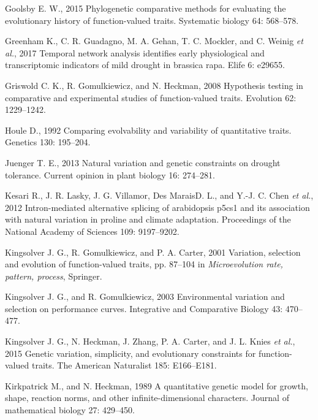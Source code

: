 \documentclass[jou,floatsintext]{apa6}
\begin{document}
\leavevmode\hypertarget{ref-goolsby2015phylogenetic}{}%
Goolsby E. W., 2015 Phylogenetic comparative methods for evaluating the evolutionary history of function-valued traits. Systematic biology 64: 568--578.

\leavevmode\hypertarget{ref-greenham2017temporal}{}%
Greenham K., C. R. Guadagno, M. A. Gehan, T. C. Mockler, and C. Weinig \emph{et al.}, 2017 Temporal network analysis identifies early physiological and transcriptomic indicators of mild drought in brassica rapa. Elife 6: e29655.

\leavevmode\hypertarget{ref-griswold2008hypothesis}{}%
Griswold C. K., R. Gomulkiewicz, and N. Heckman, 2008 Hypothesis testing in comparative and experimental studies of function-valued traits. Evolution 62: 1229--1242.

\leavevmode\hypertarget{ref-houle1992comparing}{}%
Houle D., 1992 Comparing evolvability and variability of quantitative traits. Genetics 130: 195--204.

\leavevmode\hypertarget{ref-juenger2013natural}{}%
Juenger T. E., 2013 Natural variation and genetic constraints on drought tolerance. Current opinion in plant biology 16: 274--281.

\leavevmode\hypertarget{ref-kesari2012intron}{}%
Kesari R., J. R. Lasky, J. G. Villamor, Des MaraisD. L., and Y.-J. C. Chen \emph{et al.}, 2012 Intron-mediated alternative splicing of arabidopsis p5cs1 and its association with natural variation in proline and climate adaptation. Proceedings of the National Academy of Sciences 109: 9197--9202.

\leavevmode\hypertarget{ref-kingsolver2001variation}{}%
Kingsolver J. G., R. Gomulkiewicz, and P. A. Carter, 2001 Variation, selection and evolution of function-valued traits, pp. 87--104 in \emph{Microevolution rate, pattern, process}, Springer.

\leavevmode\hypertarget{ref-kingsolver2003environmental}{}%
Kingsolver J. G., and R. Gomulkiewicz, 2003 Environmental variation and selection on performance curves. Integrative and Comparative Biology 43: 470--477.

\leavevmode\hypertarget{ref-kingsolver2015genetic}{}%
Kingsolver J. G., N. Heckman, J. Zhang, P. A. Carter, and J. L. Knies \emph{et al.}, 2015 Genetic variation, simplicity, and evolutionary constraints for function-valued traits. The American Naturalist 185: E166--E181.

\leavevmode\hypertarget{ref-kirkpatrick1989quantitative}{}%
Kirkpatrick M., and N. Heckman, 1989 A quantitative genetic model for growth, shape, reaction norms, and other infinite-dimensional characters. Journal of mathematical biology 27: 429--450.
\end{document}
